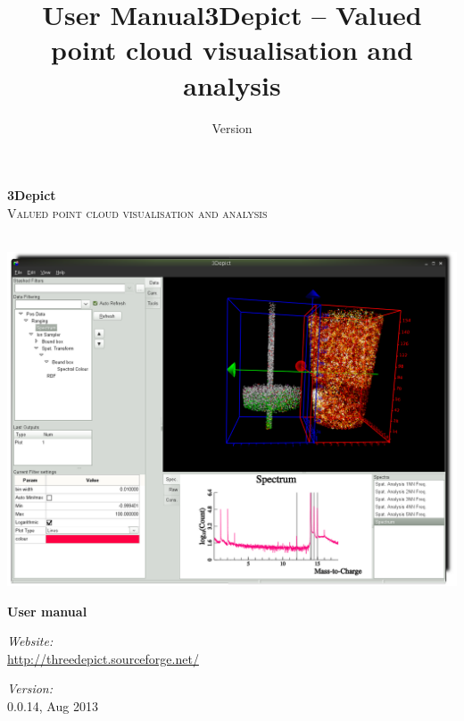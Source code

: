 \documentclass[10pt]{article}
\title{User Manual}
\date{Version}
\author{}
\begin{document}
\begin{titlepage}

\begin{center}
\vspace{3 cm}
\Huge \textbf{3Depict}\\[1.0cm]

\textsc{\Large Valued point cloud visualisation and analysis}\\
\hrulefill \\[1.0cm]

\begin{center}
 \includegraphics[width=\textwidth,keepaspectratio=true]{./figures/CoverImage.png}
\end{center}
\vspace{1.0 cm}


{ \Huge \bfseries User manual}\\[0.4cm]
\vspace{1.0 cm}


\begin{minipage}{0.5\textwidth}
\begin{flushleft} \large
\emph{Website:}\\
\url{http://threedepict.sourceforge.net/}\end{flushleft}
\end{minipage}
\begin{minipage}{0.3\textwidth}
\begin{flushright} \large
\emph{Version:} \\
 0.0.14, Aug 2013\end{flushright}
\end{minipage}

\vfill

\end{center}

\end{titlepage}
\clearpage
{}
\tableofcontents
\clearpage
{}
\title{3Depict -- Valued point cloud visualisation and analysis}
\end{document}
